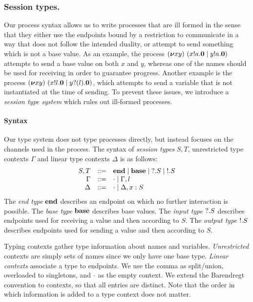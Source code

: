 \subsubsection{Session types.}
Our process syntax allows us to write processes that are ill formed in
the sense that they either use the endpoints bound by a restriction to
communicate in a way that does not follow the intended duality, or
attempt to send something which is not a base value.  As an example,
the process
\( (\bm{\nu} xy)~(x ! a . \bm{0} \mid y ! a . \bm{0}) \)
attempts to send a base value on both \( x \) and \( y\), whereas one
of the names should be used for receiving in order to guarantee
progress.  Another example is the process
\( (\bm{\nu} xy)~(x ! l . \bm{0} \mid y ? (l) . \bm{0}) \),
which attempts to send a variable that is not instantiated at the time
of sending.
%
To prevent these issues, we introduce a \emph{session type system} which
rules out ill-formed processes.

\paragraph{Syntax}
Our type system does not type processes directly, but instead focuses on the channels used in the process.
The syntax of \emph{session types} \( S, T \), unrestricted type contexts \( \Gamma \) and linear type contexts \( \Delta \) is as follows:
\[
  \begin{array}{rcl}
  S,T & ::= & \mathbf{end} \mid \mathbf{base} \mid {?}.S \mid {!}.S \\
    \Gamma &::= & \cdot \mid \Gamma, l \\
                    \Delta &::= & \cdot \mid \Delta, x : S
  \end{array}
\]
The \emph{end type} \( \mathbf{end} \) describes an endpoint on which no further interaction is possible.
The \emph{base type} \( \mathbf{base} \) describes base values.
The \emph{input type} \( {?}.S \) describes endpoints used for receiving a value and then according to \( S \).
The \emph{output type} \( {!}.S \) describes endpoints used for sending a value and then according to \( S \).

Typing contexts gather type information about names and variables.
\emph{Unrestricted} contexts are simply sets of names since we only have one
base type. \emph{Linear contexts} associate a type to endpoints. We use
the comma as split/union, overloaded to singletons, and \( \cdot \) as the
empty context. We extend the Barendregt convention to contexts, so that all
entries are distinct.  Note that the order in which information is added to a
type context does not matter.

